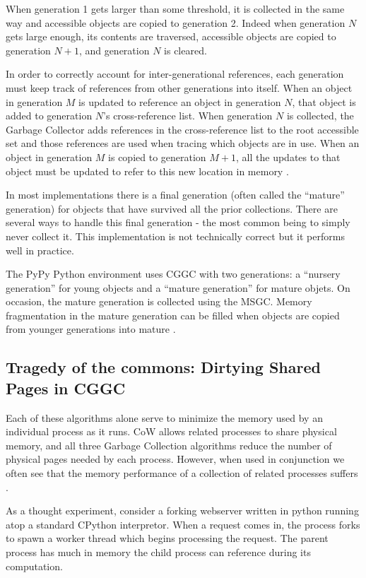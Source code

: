 \documentclass{article}
\begin{document}
When generation 1 gets larger than some threshold, it is collected in the same way and accessible objects are copied to generation 2.  Indeed when generation $N$ gets large enough, its contents are traversed, accessible objects are copied to generation $N+1$, and generation $N$ is cleared.

In order to correctly account for inter-generational references, each generation must keep track of references from other generations into itself.  When an object in generation $M$ is updated to reference an object in generation $N$, that object is added to generation $N$'s cross-reference list.  When generation $N$ is collected, the Garbage Collector adds references in the cross-reference list to the root accessible set and those references are used when tracing which objects are in use.  When an object in generation $M$ is copied to generation $M + 1$, all the updates to that object must be updated to refer to this new location in memory \cite{GC-continuum}.  

In most implementations there is a final generation (often called the ``mature'' generation) for objects that have survived all the prior collections.  There are several ways to handle this final generation - the most common being to simply never collect it.  This implementation is not technically correct but it performs well in practice.  

The PyPy Python environment uses CGGC with two generations: a ``nursery generation'' for young objects and a ``mature generation'' for mature objets.  On occasion, the mature generation is collected using the MSGC.  Memory fragmentation in the mature generation can be filled when objects are copied from younger generations into mature \cite{pypy-doc}.  

\subsection{Tragedy of the commons: Dirtying Shared Pages in CGGC}\label{sec:CoWGC}

Each of these algorithms alone serve to minimize the memory used by an individual process as it runs.  CoW allows related processes to share physical memory, and all three Garbage Collection algorithms reduce the number of physical pages needed by each process.  However, when used in conjunction we often see that the memory performance of a collection of related processes suffers \cite{dismissing_garbage}.

As a thought experiment, consider a forking webserver written in python running atop a standard CPython interpretor.  When a request comes in, the process forks to spawn a worker thread which begins processing the request.  The parent process has much in memory the child process can reference during its computation.  
\end{document}
